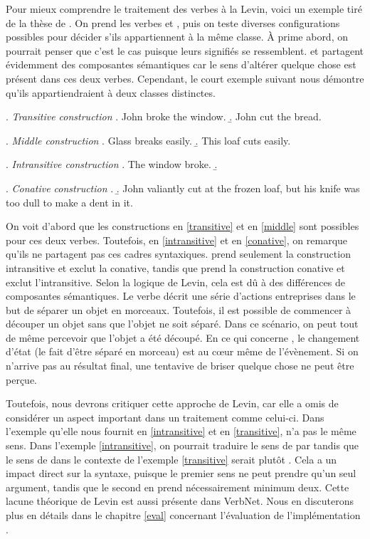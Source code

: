 Pour mieux comprendre le traitement des verbes à la Levin, voici un exemple tiré de la thèse de \cite{SchulerVerbnetBroadcoverageComprehensive2005} . On prend les verbes  et , puis on teste diverses configurations possibles pour décider s'ils appartiennent à la même classe. À prime abord, on pourrait penser que c'est le cas puisque leurs signifiés se ressemblent.  et  partagent évidemment des composantes sémantiques car le sens d'altérer quelque chose est présent dans ces deux verbes. Cependant, le court exemple suivant nous démontre qu'ils appartiendraient à deux classes distinctes.

\ex. \label{transitive} \emph{Transitive construction}
	\a. John broke the window.
	\b. John cut the bread.
	
\ex. \label{middle} \emph{Middle construction}
	\a. Glass breaks easily.
	\b. This loaf cuts easily.
	
\ex. \label{intransitive} \emph{Intransitive construction}
	\a. The window broke.
	\b. 

\ex. \label{conative} \emph{Conative construction}
	\a.
	\b. John valiantly cut at the frozen loaf, but his knife was too dull to make a dent in it.

On voit d'abord que les constructions en \ref{transitive} et en \ref{middle} sont possibles pour ces deux verbes. Toutefois, en \ref{intransitive} et en \ref{conative}, on remarque qu'ils ne partagent pas ces cadres syntaxiques.  prend seulement la construction intransitive et exclut la conative, tandis que  prend la construction conative et exclut l'intransitive. Selon la logique de Levin, cela est dû à des différences de composantes sémantiques. Le verbe  décrit une série d'actions entreprises dans le but de séparer un objet en morceaux. Toutefois, il est possible de commencer à découper un objet sans que l'objet ne soit séparé. Dans ce scénario, on peut tout de même percevoir que l'objet a été découpé. En ce qui concerne , le changement d'état (le fait d'être séparé en morceau) est au c\oe{}ur même de l'évènement. Si on n'arrive pas au résultat final, une tentavive de briser quelque chose ne peut être perçue. 

Toutefois, nous devrons critiquer cette approche de Levin, car elle a omis de considérer un aspect important dans un traitement comme celui-ci. Dans l'exemple qu'elle nous fournit en \ref{intransitive} et en \ref{transitive},  n'a pas le même sens. Dans l'exemple \ref{intransitive}, on pourrait traduire le sens de  par  tandis que le sens de  dans le contexte de l'exemple \ref{transitive} serait plutôt . Cela a un impact direct sur la syntaxe, puisque le premier sens ne peut prendre qu'un seul argument, tandis que le second en prend nécessairement minimum deux. Cette lacune théorique de Levin est aussi présente dans VerbNet. Nous en discuterons plus en détails dans le chapitre \ref{eval} concernant l'évaluation de l'implémentation .

